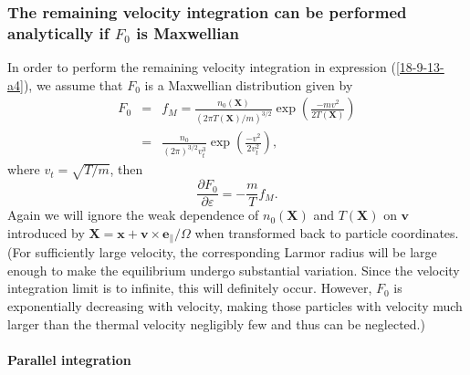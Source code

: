 \documentclass{article}
\begin{document}
\subsubsection{The remaining velocity integration can be performed
analytically if $F_0$ is Maxwellian}

In order to perform the remaining velocity integration in expression
(\ref{18-9-13-a4}), we assume that $F_0$ is a Maxwellian distribution given by
\begin{eqnarray}
  F_0 & = & f_M = \frac{n_0 (\mathbf{X})}{(2 \pi T (\mathbf{X}) / m)^{3 / 2}}
  \exp \left( \frac{- m v^2}{2 T (\mathbf{X})} \right) \\
  & = & \frac{n_0}{(2 \pi)^{3 / 2} v_t^3} \exp \left( \frac{- v^2}{2 v_t^2}
  \right), 
\end{eqnarray}
where $v_t = \sqrt{T / m}$, then
\begin{equation}
  \label{18-9-13-p6} \frac{\partial F_0}{\partial \varepsilon} = - \frac{m}{T}
  f_M .
\end{equation}
Again we will ignore the weak dependence of $n_0 (\mathbf{X})$ and $T
(\mathbf{X})$ on $\mathbf{v}$ introduced by $\mathbf{X}=\mathbf{x}+\mathbf{v}
\times \mathbf{e}_{\parallel} / \Omega$ when transformed back to particle
coordinates. (For sufficiently large velocity, the corresponding Larmor radius
will be large enough to make the equilibrium undergo substantial variation.
Since the velocity integration limit is to infinite, this will definitely
occur. However, $F_0$ is exponentially decreasing with velocity, making those
particles with velocity much larger than the thermal velocity negligibly few
and thus can be neglected.)

\paragraph{Parallel integration}
\end{document}
